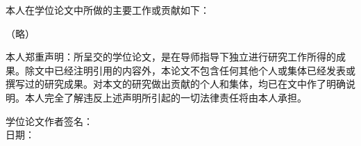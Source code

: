 \begin{center}
\end{center}

\vspace{5mm}
本人在学位论文中所做的主要工作或贡献如下：\par

（略）\par





\vspace{20mm}
本人郑重声明：所呈交的学位论文，是在导师指导下独立进行研究工作所得的成果。除文中已经注明引用的内容外，本论文不包含任何其他个人或集体已经发表或撰写过的研究成果。对本文的研究做出贡献的个人和集体，均已在文中作了明确说明。本人完全了解违反上述声明所引起的一切法律责任将由本人承担。

\vspace{20mm}
\begin{flushright}
	学位论文作者签名：\qquad\qquad\qquad\qquad\qquad\qquad\qquad
	\\
	\vspace{7mm}
	日期：\qquad\qquad\qquad\qquad\qquad\qquad\qquad
\end{flushright}